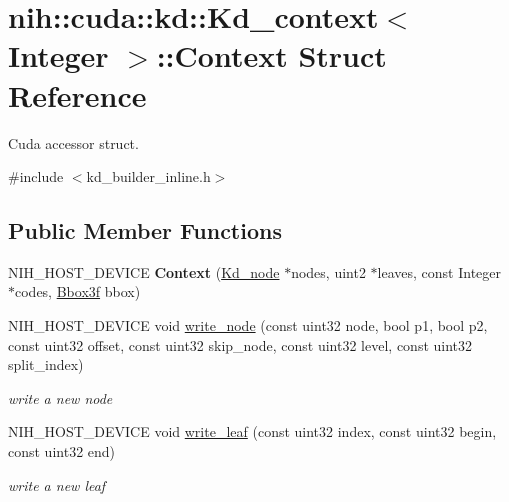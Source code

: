 \hypertarget{structnih_1_1cuda_1_1kd_1_1_kd__context_1_1_context}{
\section{nih\-:\-:cuda\-:\-:kd\-:\-:\-Kd\-\_\-context$<$ \-Integer $>$\-:\-:\-Context \-Struct \-Reference}
\label{structnih_1_1cuda_1_1kd_1_1_kd__context_1_1_context}
}


\-Cuda accessor struct.  




{\ttfamily \#include $<$kd\-\_\-builder\-\_\-inline.\-h$>$}

\subsection*{\-Public \-Member \-Functions}
\begin{DoxyCompactItemize}
\item 
\hypertarget{structnih_1_1cuda_1_1kd_1_1_kd__context_1_1_context_abf0b3ba7712b0ede2f7d3b1f67e6adfc}{
\-N\-I\-H\-\_\-\-H\-O\-S\-T\-\_\-\-D\-E\-V\-I\-C\-E {\bfseries \-Context} (\hyperlink{structnih_1_1_kd__node}{\-Kd\-\_\-node} $\ast$nodes, uint2 $\ast$leaves, const \-Integer $\ast$codes, \hyperlink{structnih_1_1_bbox}{\-Bbox3f} bbox)}
\label{structnih_1_1cuda_1_1kd_1_1_kd__context_1_1_context_abf0b3ba7712b0ede2f7d3b1f67e6adfc}

\item 
\hypertarget{structnih_1_1cuda_1_1kd_1_1_kd__context_1_1_context_a3d170a902e413d60833870869d311806}{
\-N\-I\-H\-\_\-\-H\-O\-S\-T\-\_\-\-D\-E\-V\-I\-C\-E void \hyperlink{structnih_1_1cuda_1_1kd_1_1_kd__context_1_1_context_a3d170a902e413d60833870869d311806}{write\-\_\-node} (const uint32 node, bool p1, bool p2, const uint32 offset, const uint32 skip\-\_\-node, const uint32 level, const uint32 split\-\_\-index)}
\label{structnih_1_1cuda_1_1kd_1_1_kd__context_1_1_context_a3d170a902e413d60833870869d311806}

\begin{DoxyCompactList}\small\item\em write a new node \end{DoxyCompactList}\item 
\hypertarget{structnih_1_1cuda_1_1kd_1_1_kd__context_1_1_context_a404400a5436c4b020e64f6fc069494b5}{
\-N\-I\-H\-\_\-\-H\-O\-S\-T\-\_\-\-D\-E\-V\-I\-C\-E void \hyperlink{structnih_1_1cuda_1_1kd_1_1_kd__context_1_1_context_a404400a5436c4b020e64f6fc069494b5}{write\-\_\-leaf} (const uint32 index, const uint32 begin, const uint32 end)}
\label{structnih_1_1cuda_1_1kd_1_1_kd__context_1_1_context_a404400a5436c4b020e64f6fc069494b5}

\begin{DoxyCompactList}\small\item\em write a new leaf \end{DoxyCompactList}\end{DoxyCompactItemize}
